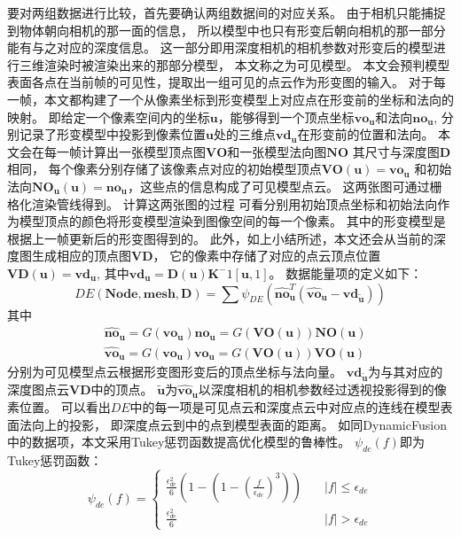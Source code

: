要对两组数据进行比较，首先要确认两组数据间的对应关系。
由于相机只能捕捉到物体朝向相机的那一面的信息，
所以模型中也只有形变后朝向相机的那一部分能有与之对应的深度信息。
这一部分即用深度相机的相机参数对形变后的模型进行三维渲染时被渲染出来的那部分模型，
本文称之为可见模型。
本文会预判模型表面各点在当前帧的可见性，提取出一组可见的点云作为形变图的输入。
对于每一帧，本文都构建了一个从像素坐标到形变模型上对应点在形变前的坐标和法向的映射。
即给定一个像素空间内的坐标$\bm{u}$，能够得到一个顶点坐标$\bm{vo_u}$和法向$\bm{no_u}$,
分别记录了形变模型中投影到像素位置$\bm{u}$处的三维点$\bm{vd_u}$在形变前的位置和法向。
本文会在每一帧计算出一张模型顶点图$\bm{VO}$和一张模型法向图$\bm{NO}$
其尺寸与深度图$\bm{D}$相同，
每个像素分别存储了该像素点对应的初始模型顶点$\bm{VO}(\bm{u})=\bm{vo_u}$
和初始法向$\bm{NO_u}(\bm{u})=\bm{no_u}$，这些点的信息构成了可见模型点云。
这两张图可通过栅格化渲染管线得到。
计算这两张图的过程
可看分别用初始顶点坐标和初始法向作为模型顶点的颜色将形变模型渲染到图像空间的每一个像素。
其中的形变模型是根据上一帧更新后的形变图得到的。
此外，如上小结所述，本文还会从当前的深度图生成相应的顶点图$\bm{VD}$，
它的像素中存储了对应的点云顶点位置$\bm{VD}(\bm{u}) = \bm{vd_u}$,
其中$\bm{vd_u}=\bm{D}(\bm{u})\bm{K}^-1[\bm{u},1]$。
数据能量项的定义如下：
\begin{equation}
    DE(\bm{Node},\bm{mesh},\bm{D})=
    \sum \psi_{DE}(
        \hat{\bm{no}}_{\bm{u}}^T
        (
            \hat{\bm{vo}}_{\bm{u}}
            -
            \bm{vd_{\widetilde{\bm{u}}}}
        )
    )
\end{equation}
其中
\begin{align}
    &\hat{\bm{no}}_{\bm{u}}=G(\bm{vo_u})\bm{no_u}=G(\bm{VO}(\bm{u}))\bm{NO}(\bm{u})\\
    &\hat{\bm{vo}}_{\bm{u}}=G(\bm{vo_u})\bm{vo_u}=G(\bm{VO}(\bm{u}))\bm{VO}(\bm{u})
\end{align}
分别为可见模型点云根据形变图形变后的顶点坐标与法向量。
$\bm{vd_{\widetilde{\bm{u}}}}$为与其对应的深度图点云$\bm{VD}$中的顶点。
$\widetilde{\bm{u}}$为$\hat{\bm{vo}}_{\bm{u}}$以深度相机的相机参数经过透视投影得到的像素位置。
可以看出$DE$中的每一项是可见点云和深度点云中对应点的连线在模型表面法向上的投影，
即深度点云到中的点到模型表面的距离。
如同DynamicFusion中的数据项，本文采用Tukey惩罚函数提高优化模型的鲁棒性。
$\psi_{de}(f)$即为Tukey惩罚函数：
\begin{equation}
    \psi_{de}(f)= 
    \begin{cases}
        \frac{\epsilon_{de}^2}{6}(1-(1-(\frac{f}{\epsilon_{de}})^3))
        &\quad |f|\leq\epsilon_{de}\\

        \frac{\epsilon_{de}^2}{6}
        &\quad |f|>\epsilon_{de}
        
    \end{cases}
\end{equation}
